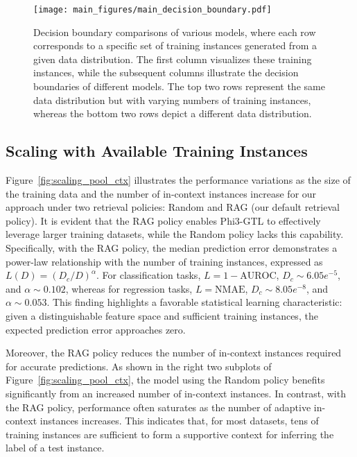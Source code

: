 \begin{figure*}[t]
\vskip 0.2in
\begin{center}
\centerline{\texttt{[image: main\_figures/main\_decision\_boundary.pdf]}}
\caption{
Decision boundary comparisons of various models, where each row corresponds to a specific set of training instances generated from a given data distribution. The first column visualizes these training instances, while the subsequent columns illustrate the decision boundaries of different models. The top two rows represent the same data distribution but with varying numbers of training instances, whereas the bottom two rows depict a different data distribution.
}
\label{fig:decision_boundary}
\end{center}
\vskip -0.2in
\end{figure*}


\subsection{Scaling with Available Training Instances}
\label{sec:exp_scaling_pool_ctx}

Figure~\ref{fig:scaling_pool_ctx} illustrates the performance variations as the size of the training data and the number of in-context instances increase for our approach under two retrieval policies: Random and RAG (our default retrieval policy).
It is evident that the RAG policy enables Phi3-GTL to effectively leverage larger training datasets, while the Random policy lacks this capability. Specifically, with the RAG policy, the median prediction error demonstrates a power-law relationship with the number of training instances, expressed as $L(D) = (D_c / D)^{\alpha}$. For classification tasks, $L=1-\text{AUROC}$, $D_c \sim 6.05e^{-5}$, and $\alpha \sim 0.102$, whereas for regression tasks, $L=\text{NMAE}$, $D_c \sim 8.05e^{-8}$, and $\alpha \sim 0.053$. This finding highlights a favorable statistical learning characteristic: given a distinguishable feature space and sufficient training instances, the expected prediction error approaches zero.

Moreover, the RAG policy reduces the number of in-context instances required for accurate predictions. As shown in the right two subplots of Figure~\ref{fig:scaling_pool_ctx}, the model using the Random policy benefits significantly from an increased number of in-context instances. In contrast, with the RAG policy, performance often saturates as the number of adaptive in-context instances increases. This indicates that, for most datasets, tens of training instances are sufficient to form a supportive context for inferring the label of a test instance.


